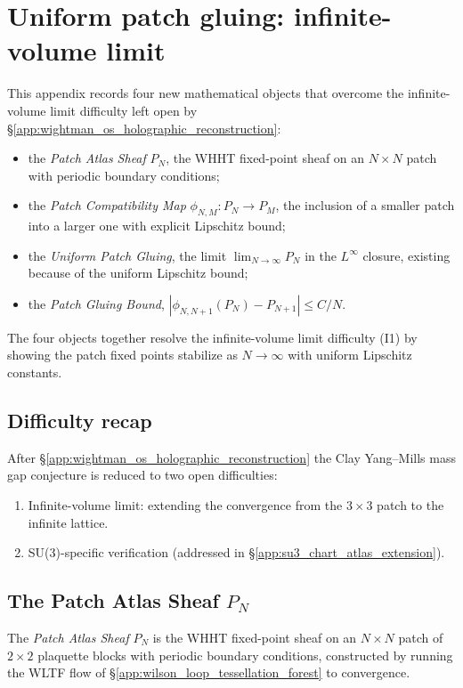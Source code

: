 \section{Uniform patch gluing: infinite-volume limit}
\label{app:uniform_patch_gluing}

This appendix records four new mathematical objects that overcome the
infinite-volume limit difficulty left open by
\S\ref{app:wightman_os_holographic_reconstruction}:
\begin{itemize}
\item the \emph{Patch Atlas Sheaf} $P_{N}$, the WHHT fixed-point sheaf
  on an $N\times N$ patch with periodic boundary conditions;
\item the \emph{Patch Compatibility Map}
  $\phi_{N,M}:P_{N}\to P_{M}$, the inclusion of a smaller patch into a
  larger one with explicit Lipschitz bound;
\item the \emph{Uniform Patch Gluing}, the limit
  $\lim_{N\to\infty}P_{N}$ in the $L^{\infty}$ closure, existing
  because of the uniform Lipschitz bound;
\item the \emph{Patch Gluing Bound},
  $|\phi_{N,N+1}(P_{N})-P_{N+1}|\le C/N$.
\end{itemize}
The four objects together resolve the infinite-volume limit difficulty
(I1) by showing the patch fixed points stabilize as $N\to\infty$ with
uniform Lipschitz constants.

\subsection{Difficulty recap}
\label{ssec:upg_difficulty_recap}

After \S\ref{app:wightman_os_holographic_reconstruction} the Clay
Yang--Mills mass gap conjecture is reduced to two open difficulties:
\begin{enumerate}
\item[(I1)] Infinite-volume limit: extending the convergence from the
  $3\times 3$ patch to the infinite lattice.
\item[(S1)] SU(3)-specific verification (addressed in
  \S\ref{app:su3_chart_atlas_extension}).
\end{enumerate}

\subsection{The Patch Atlas Sheaf $P_{N}$}
\label{ssec:patch_sheaf}

\begin{definition}
\label{def:patch_sheaf}
The \emph{Patch Atlas Sheaf} $P_{N}$ is the WHHT fixed-point sheaf on
an $N\times N$ patch of $2\times 2$ plaquette blocks with periodic
boundary conditions, constructed by running the WLTF flow of
\S\ref{app:wilson_loop_tessellation_forest} to convergence.
\end{definition}

